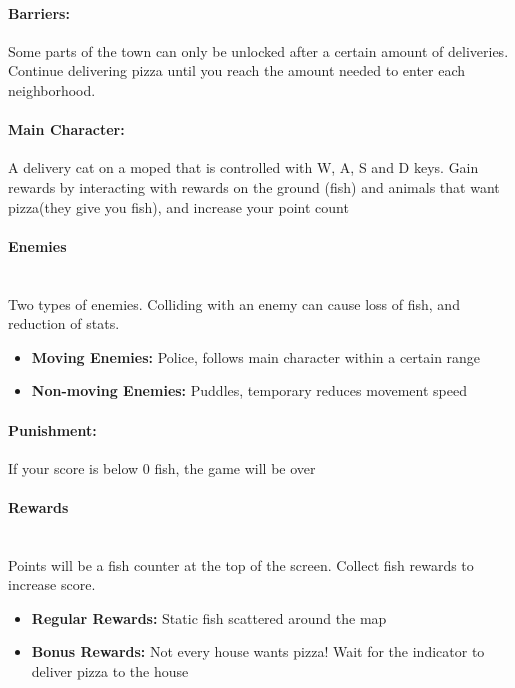 \documentclass{article}
\begin{document}
\paragraph{Barriers:}Some parts of the town can only be unlocked after a certain amount of deliveries. Continue delivering pizza until you reach the amount needed to enter each neighborhood.

\paragraph{Main Character:}A delivery cat on a moped that is controlled with W, A, S and D keys. Gain rewards by interacting with rewards on the ground (fish) and animals that want pizza(they give you fish), and increase your point count

\paragraph{\centering \large{\textbf{Enemies}}\\}~\\
Two types of enemies. Colliding with an enemy can cause loss of fish, and reduction of stats.

\begin{itemize}
	\item \textbf{Moving Enemies:} Police, follows main character within a certain range
	\item \textbf{Non-moving Enemies:} Puddles, temporary reduces movement speed 

\end{itemize}

\paragraph{Punishment:} If your score is below 0 fish, the game will be over

\bigskip
\paragraph{\centering \large{\textbf{Rewards}}\\}~\\
Points will be a fish counter at the top of the screen. Collect fish rewards to increase score.

\begin{itemize}
	\item \textbf{Regular Rewards:} Static fish scattered around the map
	\item \textbf{Bonus Rewards:} Not every house wants pizza! Wait for the indicator to deliver pizza to the house

\end{itemize}
\end{document}
